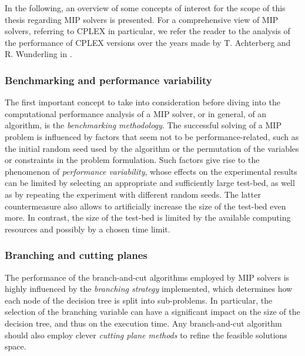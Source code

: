 \documentclass[a4paper,12pt,twoside]{scrbook}
\begin{document}
In the following, an overview of some concepts of interest for the scope of this thesis regarding MIP solvers is presented. For a comprehensive view of MIP solvers, referring to CPLEX in particular, we refer the reader to the analysis of the performance of CPLEX versions over the years made by T. Achterberg and R. Wunderling in \cite{achterberg2013}. \par

\subsubsection{Benchmarking and performance variability}
The first important concept to take into consideration before diving into the computational performance analysis of a MIP solver, or in general, of an algorithm, is the \textit{benchmarking methodology}. The successful solving of a MIP problem is influenced by factors that seem not to be performance-related, such as the initial random seed used by the algorithm or the permutation of the variables or constraints in the problem formulation. Such factors give rise to the phenomenon of \textit{performance variability}, whose effects on the experimental results can be limited by selecting an appropriate and sufficiently large test-bed, as well as by repeating the experiment with different random seeds. The latter countermeasure also allows to artificially increase the size of the test-bed even more. In contrast, the size of the test-bed is limited by the available computing resources and possibly by a chosen time limit. \par 

\subsubsection{Branching and cutting planes}
The performance of the branch-and-cut algorithms employed by MIP solvers is highly influenced by the \textit{branching strategy} implemented, which determines how each node of the decision tree is split into sub-problems. In particular, the selection of the branching variable can have a significant impact on the size of the decision tree, and thus on the execution time.
Any branch-and-cut algorithm should also employ clever \textit{cutting plane methods} to refine the feasible solutions space. \par 
\end{document}
